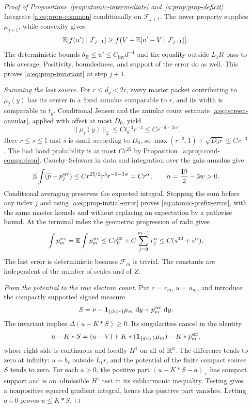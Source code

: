 \begin{proof}[Proof of Propositions~\ref{prop:atomic-intermediate} and~\ref{a:prop:prop-deficit}]
Integrate \eqref{a:eq:prop-common} conditionally on
$\mathcal F_{j+1}$.  The tower property supplies $\mu_{j+1}$, while
convexity gives
\[
 \mathbb E[f(u')\mid\mathcal F_{j+1}]
       \ge f\bigl(V+\mathbb E[u'-V\mid\mathcal F_{j+1}]\bigr).
\]
The deterministic bounds $b_R\le u'\le C_{\mathrm{inv}}d^{-4}$
and the equality outside $L_1R$ pass to this average.  Positivity,
boundedness, and support of the error do as well.  This proves
\eqref{a:eq:prop-invariant} at step $j+1$.

\emph{Summing the lost source.}
For $r\le d_y<2r$, every master packet contributing to $\mu_j(y)$
has its center in a fixed annulus comparable to $r$, and its width is
comparable to $t_y$.  Conditional Jensen and the annular count estimate
\eqref{a:eq:screen-annular}, applied with offset at most $D_0$, yield
\[
 \|\mu_j(y)\|_2\le Ct_y^{-3}r^{-3}
              \le Cr^{-6-3w}.
\]
Here $r\le s\le1$ and $s$ is small according to $D_0$, so
$\max(r^{-3},1)+\sqrt{D_0r}\le Cr^{-3}$.
The bad band probability is at most $Cr^{25}$ by
Proposition~\ref{a:prop:cond-comparison}.  Cauchy--Schwarz in data and
integration over the gain annulus give
\[
 \mathbb E\int(\widetilde p-p_j^{\mathrm{err}})
 \le C r^{25/2}r^3r^{-6-3w}
 =Cr^{\alpha},\qquad \alpha=\frac{19}{2}-3w>0.
\]
Conditional averaging preserves the expected integral. Stopping the
sum before any index $j$ and using \eqref{a:eq:prop-initial-error}
proves \eqref{eq:atomic-prefix-error}, with the same master kernels
and without replacing an expectation by a pathwise bound. At the
terminal index the geometric progression of radii gives
\begin{equation}
\label{a:eq:prop-total-error}
 \int p_m^{\mathrm{err}}
 =\mathbb E\int p_m^{\mathrm{err}}
 \le Cr_0^{32}+C\sum_{j=0}^{m-1}r_j^\alpha
 \le C(s^{32}+s^\alpha).
\end{equation}
The last error is deterministic because $\mathcal F_m$ is trivial.
The constants are independent of the number of scales and of $Z$.

\emph{From the potential to the raw electron count.}
Put $r=r_m$, $u=u_m$, and introduce the compactly supported signed
measure
\[
 S=\nu-\mathbf 1_{\{d<r\}}\mu_m\,\,\mathrm d y+p_m^{\mathrm{err}}\,\,\mathrm d y.
\]
The invariant implies $\Delta(u-K*S)\ge0$.  Its singularities cancel
in the identity
\[
 u-K*S=(u-V)+K*(\mathbf 1_{\{d<r\}}\mu_m)-K*p_m^{\mathrm{err}},
\]
whose right side is continuous and locally $H^1$ on all of $\mathbb R^3$.
The difference tends to zero at infinity: $u=b_r$ outside $L_1r$,
and the potential of the finite compact source $S$ tends to zero.
For each $a>0$, the positive part $(u-K*S-a)_+$ has compact support
and is an admissible $H^1$ test in its subharmonic inequality.  Testing
gives a nonpositive squared gradient integral, hence this positive
part vanishes.  Letting $a\downarrow0$ proves $u\le K*S$.


\end{proof}
